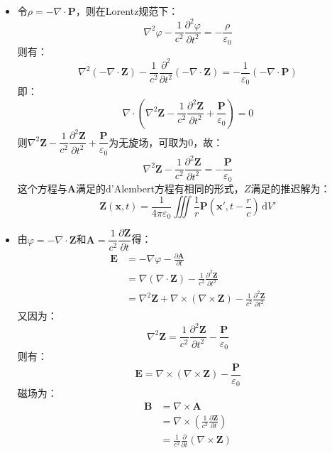 \documentclass[a4paper,fontset=none]{ctexart}
\begin{document}
\begin{itemize}
        \item[5.(2)]
        令$\rho=-\nabla\cdot\bm{P}$，则在Lorentz规范下：
        \[
            \nabla^2\varphi - \frac{1}{c^2}\frac{\partial^2\varphi}{\partial t^2} = -\frac{\rho}{\varepsilon_0}
        \]
        则有：
        \[
            \nabla^2(-\nabla\cdot\bm{Z}) - \frac{1}{c^2}\frac{\partial^2}{\partial t^2}(-\nabla\cdot\bm{Z}) = -\frac{1}{\varepsilon_0}(-\nabla\cdot\bm{P})
        \]
        即：
        \[
            \nabla \cdot \left(\nabla^2\bm{Z} - \frac{1}{c^2}\frac{\partial^2\bm{Z}}{\partial t^2} + \frac{\bm{P}}{\varepsilon_0}\right) = 0
        \]
        则$\nabla^2\bm{Z}-\dfrac{1}{c^2}\dfrac{\partial^2\bm{Z}}{\partial t^2}+\dfrac{\bm{P}}{\varepsilon_0}$为无旋场，可取为0，故：
        \[
            \nabla^2\bm{Z} - \frac{1}{c^2}\frac{\partial^2\bm{Z}}{\partial t^2} = -\frac{\bm{P}}{\varepsilon_0}
        \]
        这个方程与$\bm{A}$满足的d'Alembert方程有相同的形式，$Z$满足的推迟解为：
        \[
            \bm{Z}(\bm{x}, t) = \frac{1}{4\pi\varepsilon_0} \iiint \frac{1}{r}\bm{P}\left(\bm{x}', t-\frac{r}{c}\right)\,\mathrm{d}V'
        \]

        \item[5.(3)]
        由$\varphi=-\nabla\cdot\bm{Z}$和$\bm{A}=\dfrac{1}{c^2}\dfrac{\partial\bm{Z}}{\partial t}$得：
        \begin{align*}
            \bm{E}
            &= -\nabla\varphi - \frac{\partial\bm{A}}{\partial t} \\
            &= \nabla(\nabla \cdot \bm{Z}) - \frac{1}{c^2}\frac{\partial^2\bm{Z}}{\partial t^2} \\
            &= \nabla^2\bm{Z} + \nabla \times (\nabla \times \bm{Z}) - \frac{1}{c^2}\frac{\partial^2\bm{Z}}{\partial t^2}
        \end{align*}
        又因为：
        \[
            \nabla^2\bm{Z} = \frac{1}{c^2}\frac{\partial^2\bm{Z}}{\partial t^2} - \frac{\bm{P}}{\varepsilon_0}
        \]
        则有：
        \[
            \bm{E} = \nabla \times (\nabla \times \bm{Z}) - \frac{\bm{P}}{\varepsilon_0}
        \]
        磁场为：
        \begin{align*}
            \bm{B}
            &= \nabla \times \bm{A} \\
            &= \nabla \times \left(\frac{1}{c^2}\frac{\partial\bm{Z}}{\partial t}\right) \\
            &= \frac{1}{c^2}\frac{\partial}{\partial t}(\nabla \times \bm{Z})
        \end{align*}


\end{itemize}
\end{document}
